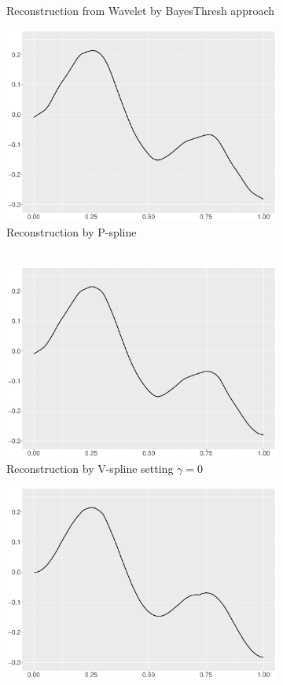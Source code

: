 \begin{figure}
\begin{subfigure}{0.45\textwidth}
    \caption{Reconstruction from Wavelet by BayesThresh approach}
    \end{subfigure}
    \begin{subfigure}{0.45\textwidth}
    \centering
    \includegraphics[width=\linewidth,height=0.45\textwidth]{Chapters/02TractorSplineTheory/plot/ggplot/ggHeaviSinePSpline.pdf}
    \caption{Reconstruction by P-spline \\ \mbox{  } }
    \end{subfigure}
    \begin{subfigure}{0.45\textwidth}
    \centering
    \includegraphics[width=\linewidth,height=0.45\textwidth]{Chapters/02TractorSplineTheory/plot/ggplot/ggHeaviSineGamma.pdf}
    \caption{Reconstruction by V-spline setting $\gamma=0$}
    \end{subfigure}
  \begin{subfigure}{0.45\textwidth}
    \centering
    \includegraphics[width=\linewidth,height=0.45\textwidth]{Chapters/02TractorSplineTheory/plot/ggplot/ggHeaviSineTractorAPT.pdf}

\end{subfigure}
\end{figure}
